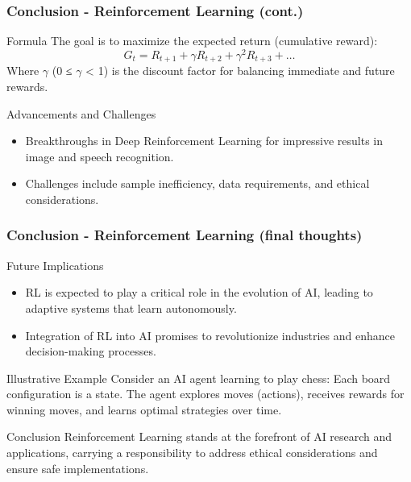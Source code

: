 \documentclass[aspectratio=169]{beamer}
\begin{document}
\begin{frame}[fragile]
    \frametitle{Conclusion - Reinforcement Learning (cont.)}
    \begin{block}{Formula}
        The goal is to maximize the expected return (cumulative reward):
        \begin{equation}
            G_t = R_{t+1} + \gamma R_{t+2} + \gamma^2 R_{t+3} + \ldots
        \end{equation}
        Where $\gamma$ (0 ≤ $\gamma$ < 1) is the discount factor for balancing immediate and future rewards.
    \end{block}

    \begin{block}{Advancements and Challenges}
        \begin{itemize}
            \item Breakthroughs in Deep Reinforcement Learning for impressive results in image and speech recognition.
            \item Challenges include sample inefficiency, data requirements, and ethical considerations.
        \end{itemize}
    \end{block}
\end{frame}

\begin{frame}[fragile]
    \frametitle{Conclusion - Reinforcement Learning (final thoughts)}
    \begin{block}{Future Implications}
        \begin{itemize}
            \item RL is expected to play a critical role in the evolution of AI, leading to adaptive systems that learn autonomously.
            \item Integration of RL into AI promises to revolutionize industries and enhance decision-making processes.
        \end{itemize}
    \end{block}

    \begin{block}{Illustrative Example}
        Consider an AI agent learning to play chess: Each board configuration is a state. The agent explores moves (actions), receives rewards for winning moves, and learns optimal strategies over time.
    \end{block}

    \begin{block}{Conclusion}
        Reinforcement Learning stands at the forefront of AI research and applications, carrying a responsibility to address ethical considerations and ensure safe implementations.
    \end{block}
\end{frame}
\end{document}

